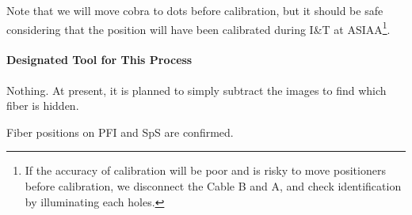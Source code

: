 Note that we will move cobra to dots before calibration, but it should be safe considering that the position will have been calibrated during I\&T at ASIAA\footnote{If the accuracy of calibration will be poor and is risky to move positioners before calibration, we disconnect the Cable B and A, and check identification by illuminating each holes.}.



\paragraph{Designated Tool for This Process}
Nothing.
At present, it is planned to simply subtract the images to find which fiber is hidden.

\begin{itembox}[l]{}
Fiber positions on PFI and SpS are confirmed.
\end{itembox}